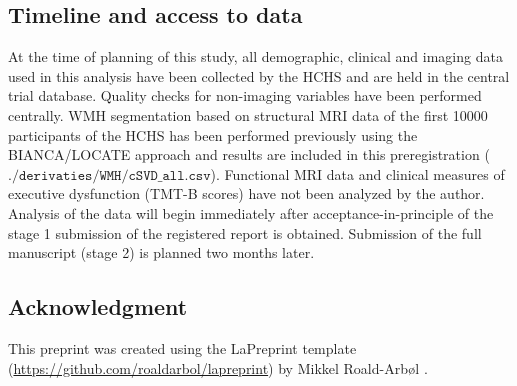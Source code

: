\subsection{Timeline and access to data}
At the time of planning of this study, all demographic, clinical and imaging data used in this analysis have been collected by the HCHS and are held in the central trial database.
Quality checks for non-imaging variables have been performed centrally.
WMH segmentation based on structural MRI data of the first \num{10000} participants of the HCHS has been performed previously using the BIANCA/LOCATE approach \citep{Rimmele2022-bz} and results are included in this preregistration ($\texttt{./derivaties/WMH/cSVD\_all.csv}$).
Functional MRI data and clinical measures of executive dysfunction (TMT-B scores) have not been analyzed by the author.
Analysis of the data will begin immediately after acceptance-in-principle of the stage 1 submission of the registered report is obtained. Submission of the full manuscript (stage 2) is planned two months later.

\subsection{Acknowledgment}
This preprint was created using the LaPreprint template (\url{https://github.com/roaldarbol/lapreprint}) by Mikkel Roald-Arb\o l \textsuperscript{}.

